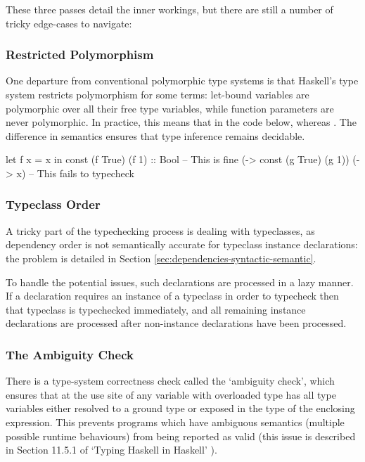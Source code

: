 \documentclass[dissertation.tex]{subfiles}
\begin{document}
{{        These three passes detail the inner workings, but there are still a number of tricky edge-cases to navigate:

        \subsubsection*{Restricted Polymorphism}
        {
            One departure from conventional polymorphic type systems is that Haskell's type system restricts polymorphism for some terms: let-bound variables are polymorphic over all their free type variables, while function parameters are never polymorphic. In practice, this means that in the code below,  whereas . The difference in semantics ensures that type inference remains decidable. 

            \begin{haskellfigure}
            let f x = x in const (f True) (f 1) :: Bool -- This is fine
            (\g -> const (g True) (g 1)) (\x -> x)      -- This fails to typecheck
            \end{haskellfigure}
        }
        \subsubsection*{Typeclass Order}
        {
            A tricky part of the typechecking process is dealing with typeclasses, as dependency order is not semantically accurate for typeclass instance declarations: the problem is detailed in Section \ref{sec:dependencies-syntactic-semantic}.
            
            To handle the potential issues, such declarations are processed in a lazy manner. If a declaration requires an instance of a typeclass in order to typecheck then that typeclass is typechecked immediately, and all remaining instance declarations are processed after non-instance declarations have been processed.
        }
        \subsubsection*{The Ambiguity Check}
        {
            There is a type-system correctness check called the `ambiguity check', which ensures that at the use site of any variable with overloaded type has all type variables either resolved to a ground type or exposed in the type of the enclosing expression. This prevents programs which have ambiguous semantics (multiple possible runtime behaviours) from being reported as valid (this issue is described in Section 11.5.1 of `Typing Haskell in Haskell' \cite{THIH}). 

}}}
\end{document}
